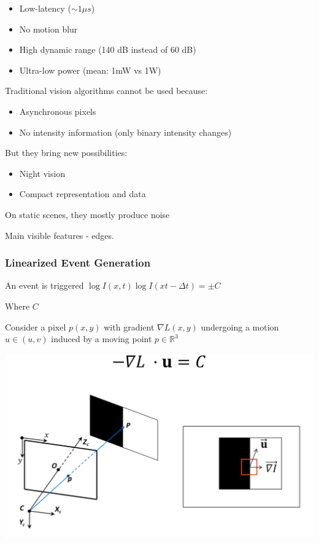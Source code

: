 \begin{itemize}
\item Low-latency ($\sim1 \mu s$)
\item No motion blur
\item High dynamic range (140 dB instead of 60 dB)
\item Ultra-low power (mean: 1mW vs 1W)
\end{itemize}

Traditional vision algorithms cannot be used because:
\begin{itemize}
\item Asynchronous pixels
\item No intensity information (only binary intensity changes)
\end{itemize}

But they bring new possibilities:
\begin{itemize}
\item Night vision
\item Compact representation and data
\end{itemize}

On static scenes, they mostly produce noise

Main visible features - edges. 

\subsubsection{Linearized Event Generation}

An event is triggered $\log I(x,t) \log I(xt-\Delta t)=\pm C$

Where $C$ 

Consider a pixel $p(x,y)$ with gradient $\nabla L(x,y)$ undergoing a motion $u\in(u,v)$ induced by a moving point $p \in\mathbb{R}^3 $

\includegraphics[width=0.9\columnwidth]{event_cameras_fig/event_cameras.png}

